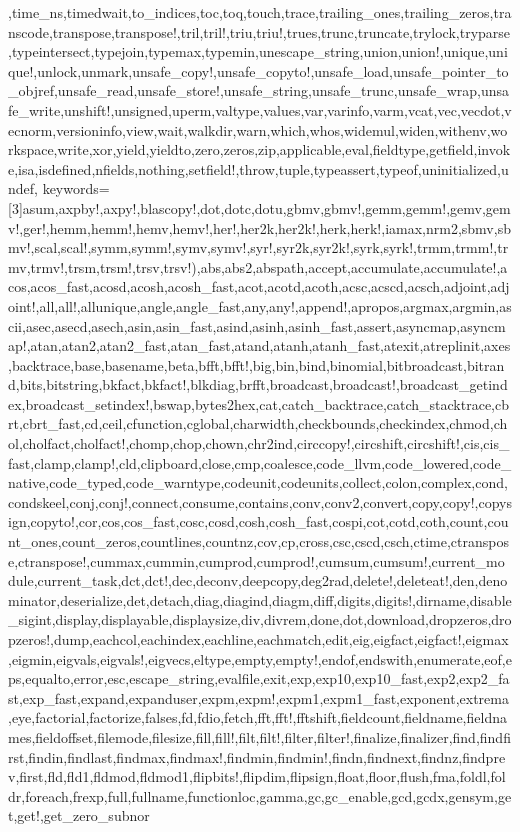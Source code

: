{,time_ns,timedwait,to_indices,toc,toq,touch,trace,trailing_ones,trailing_zeros,transcode,transpose,transpose!,tril,tril!,triu,triu!,trues,trunc,truncate,trylock,tryparse,typeintersect,typejoin,typemax,typemin,unescape_string,union,union!,unique,unique!,unlock,unmark,unsafe_copy!,unsafe_copyto!,unsafe_load,unsafe_pointer_to_objref,unsafe_read,unsafe_store!,unsafe_string,unsafe_trunc,unsafe_wrap,unsafe_write,unshift!,unsigned,uperm,valtype,values,var,varinfo,varm,vcat,vec,vecdot,vecnorm,versioninfo,view,wait,walkdir,warn,which,whos,widemul,widen,withenv,workspace,write,xor,yield,yieldto,zero,zeros,zip,applicable,eval,fieldtype,getfield,invoke,isa,isdefined,nfields,nothing,setfield!,throw,tuple,typeassert,typeof,uninitialized,undef},%
    keywords=[3]{asum,axpby!,axpy!,blascopy!,dot,dotc,dotu,gbmv,gbmv!,gemm,gemm!,gemv,gemv!,ger!,hemm,hemm!,hemv,hemv!,her!,her2k,her2k!,herk,herk!,iamax,nrm2,sbmv,sbmv!,scal,scal!,symm,symm!,symv,symv!,syr!,syr2k,syr2k!,syrk,syrk!,trmm,trmm!,trmv,trmv!,trsm,trsm!,trsv,trsv!),abs,abs2,abspath,accept,accumulate,accumulate!,acos,acos_fast,acosd,acosh,acosh_fast,acot,acotd,acoth,acsc,acscd,acsch,adjoint,adjoint!,all,all!,allunique,angle,angle_fast,any,any!,append!,apropos,argmax,argmin,ascii,asec,asecd,asech,asin,asin_fast,asind,asinh,asinh_fast,assert,asyncmap,asyncmap!,atan,atan2,atan2_fast,atan_fast,atand,atanh,atanh_fast,atexit,atreplinit,axes,backtrace,base,basename,beta,bfft,bfft!,big,bin,bind,binomial,bitbroadcast,bitrand,bits,bitstring,bkfact,bkfact!,blkdiag,brfft,broadcast,broadcast!,broadcast_getindex,broadcast_setindex!,bswap,bytes2hex,cat,catch_backtrace,catch_stacktrace,cbrt,cbrt_fast,cd,ceil,cfunction,cglobal,charwidth,checkbounds,checkindex,chmod,chol,cholfact,cholfact!,chomp,chop,chown,chr2ind,circcopy!,circshift,circshift!,cis,cis_fast,clamp,clamp!,cld,clipboard,close,cmp,coalesce,code_llvm,code_lowered,code_native,code_typed,code_warntype,codeunit,codeunits,collect,colon,complex,cond,condskeel,conj,conj!,connect,consume,contains,conv,conv2,convert,copy,copy!,copysign,copyto!,cor,cos,cos_fast,cosc,cosd,cosh,cosh_fast,cospi,cot,cotd,coth,count,count_ones,count_zeros,countlines,countnz,cov,cp,cross,csc,cscd,csch,ctime,ctranspose,ctranspose!,cummax,cummin,cumprod,cumprod!,cumsum,cumsum!,current_module,current_task,dct,dct!,dec,deconv,deepcopy,deg2rad,delete!,deleteat!,den,denominator,deserialize,det,detach,diag,diagind,diagm,diff,digits,digits!,dirname,disable_sigint,display,displayable,displaysize,div,divrem,done,dot,download,dropzeros,dropzeros!,dump,eachcol,eachindex,eachline,eachmatch,edit,eig,eigfact,eigfact!,eigmax,eigmin,eigvals,eigvals!,eigvecs,eltype,empty,empty!,endof,endswith,enumerate,eof,eps,equalto,error,esc,escape_string,evalfile,exit,exp,exp10,exp10_fast,exp2,exp2_fast,exp_fast,expand,expanduser,expm,expm!,expm1,expm1_fast,exponent,extrema,eye,factorial,factorize,falses,fd,fdio,fetch,fft,fft!,fftshift,fieldcount,fieldname,fieldnames,fieldoffset,filemode,filesize,fill,fill!,filt,filt!,filter,filter!,finalize,finalizer,find,findfirst,findin,findlast,findmax,findmax!,findmin,findmin!,findn,findnext,findnz,findprev,first,fld,fld1,fldmod,fldmod1,flipbits!,flipdim,flipsign,float,floor,flush,fma,foldl,foldr,foreach,frexp,full,fullname,functionloc,gamma,gc,gc_enable,gcd,gcdx,gensym,get,get!,get_zero_subnor}
